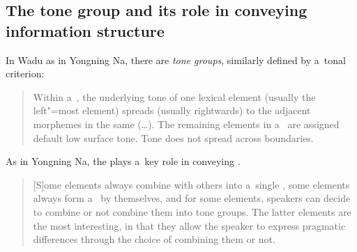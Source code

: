 \subsection[The tone group and its ties with information structure]{The tone group and its role in conveying information structure}
\label{sec:thetonegroupasbuildingblockofutterancesanditsroleinconveyinginformationstructure}

In Wadu   as in Yongning Na, there are \textit{tone groups}, similarly defined by
a~tonal criterion:

\begin{quotation}
	Within a~, the underlying tone of one lexical element (usually the left"=most element)
	spreads (usually rightwards) to the adjacent morphemes in the same  ({\dots}). The
	remaining elements in a~ are assigned default low surface tone. Tone does not
	spread across  boundaries. \citep[66]{daudey2014}
\end{quotation}

{\noindent}As in Yongning Na, the  plays a~key role in conveying .

\begin{quotation}
	[S]ome elements always combine with others into a~single , some elements always form
	a~ by themselves, and for some elements, speakers can decide to combine or not combine
	them into tone groups. The latter elements are the most interesting, in that they allow the speaker
	to express pragmatic differences through the choice of combining them or not. \citep[68]{daudey2014}
\end{quotation}

